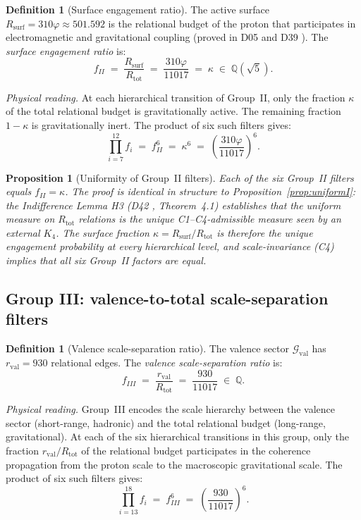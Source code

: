 \documentclass[12pt,a4paper]{article}
\newcommand{\Gval}{\mathcal{G}_{\mathrm{val}}}
\theoremstyle{plain}
\newtheorem{proposition}[theorem]{Proposition}
\theoremstyle{definition}
\newtheorem{definition}[theorem]{Definition}
\theoremstyle{remark}
\newcommand{\Kfour}{K_4}
\newcommand{\vp}{\varphi}
\newcommand{\kap}{\kappa}
\newcommand{\rval}{r_{\mathrm{val}}}
\newcommand{\Rtot}{R_{\mathrm{tot}}}
\newcommand{\Rsurf}{R_{\mathrm{surf}}}
\begin{document}
\begin{definition}[Surface engagement ratio]
\label{def:fII}
The active surface $\Rsurf = 310\vp \approx 501.592$ is the relational budget of the proton that participates in electromagnetic and gravitational coupling (proved in D05 \citep{D05} and D39 \citep{D39}). The \emph{surface engagement ratio} is:
\[
f_{II} \;=\; \frac{\Rsurf}{\Rtot} \;=\; \frac{310\vp}{11017} \;=\; \kap \;\in\; \mathbb{Q}(\sqrt{5}).
\]
\end{definition}

\noindent \textit{Physical reading.} At each hierarchical transition of Group~II, only the fraction $\kap$ of the total relational budget is gravitationally active. The remaining fraction $1-\kap$ is gravitationally inert. The product of six such filters gives:
\[
\prod_{i=7}^{12} f_i \;=\; f_{II}^6 \;=\; \kap^6 \;=\; \left(\frac{310\vp}{11017}\right)^6.
\]

\begin{proposition}[Uniformity of Group~II filters]
\label{prop:uniformII}
Each of the six Group~II filters equals $f_{II} = \kap$. The proof is identical in structure to Proposition~\ref{prop:uniformI}: the Indifference Lemma H3 (D42 \citep{D42}, Theorem~4.1) establishes that the uniform measure on $\Rtot$ relations is the unique C1--C4-admissible measure seen by an external $\Kfour$. The surface fraction $\kap = \Rsurf/\Rtot$ is therefore the unique engagement probability at every hierarchical level, and scale-invariance (C4) implies that all six Group~II factors are equal.
\end{proposition}

\subsection{Group III: valence-to-total scale-separation filters}
\label{subsec:groupIII}

\begin{definition}[Valence scale-separation ratio]
\label{def:fIII}
The valence sector $\Gval$ has $\rval = 930$ relational edges. The \emph{valence scale-separation ratio} is:
\[
f_{III} \;=\; \frac{\rval}{\Rtot} \;=\; \frac{930}{11017} \;\in\; \mathbb{Q}.
\]
\end{definition}

\noindent \textit{Physical reading.} Group~III encodes the scale hierarchy between the valence sector (short-range, hadronic) and the total relational budget (long-range, gravitational). At each of the six hierarchical transitions in this group, only the fraction $\rval/\Rtot$ of the relational budget participates in the coherence propagation from the proton scale to the macroscopic gravitational scale. The product of six such filters gives:
\[
\prod_{i=13}^{18} f_i \;=\; f_{III}^6 \;=\; \left(\frac{930}{11017}\right)^6.
\]
\end{document}
